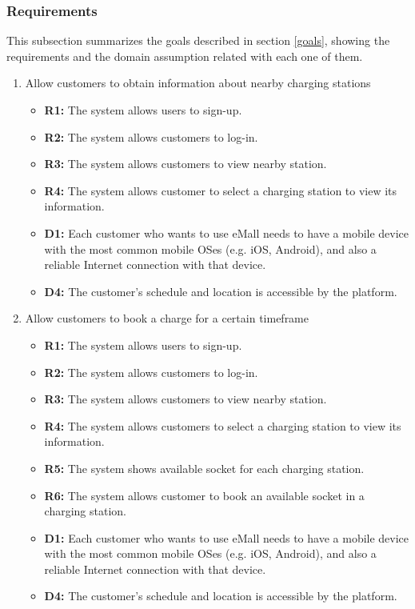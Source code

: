 \subsubsection{Requirements}
This subsection summarizes the goals described in section \ref{goals}, showing the requirements and the domain assumption related with each one of them.
\begin{enumerate}[label=\textbf{-G\arabic*}:]
    \item {Allow customers to obtain information about nearby charging stations
          \begin{itemize}
            \item \textbf{R1:} The system allows users to sign-up.
            \item \textbf{R2:} The system allows customers to log-in.
            \item \textbf{R3:} The system allows customers to view nearby station.
            \item \textbf{R4:} The system allows customer to select a charging station to view its information.
            \item \textbf{D1:} Each customer who wants to use eMall needs to have a mobile device with the most common mobile OSes (e.g. iOS, Android), and also a reliable Internet connection with that device.
            \item \textbf{D4:} The customer's schedule and location is accessible by the platform.
          \end{itemize}
          }
    \item {Allow customers to book a charge for a certain timeframe
          \begin{itemize}
            \item \textbf{R1:} The system allows users to sign-up.
            \item \textbf{R2:} The system allows customers to log-in.
            \item \textbf{R3:} The system allows customers to view nearby station.  
            \item \textbf{R4:} The system allows customers to select a charging station to view its information.
            \item \textbf{R5:} The system shows available socket for each charging station.
            \item \textbf{R6:} The system allows customer to book an available socket in a charging station.
            \item \textbf{D1:} Each customer who wants to use eMall needs to have a mobile device with the most common mobile OSes (e.g. iOS, Android), and also a reliable Internet connection with that device.
            \item \textbf{D4:} The customer's schedule and location is accessible by the platform.
                            

\end{itemize}}
\end{enumerate}
